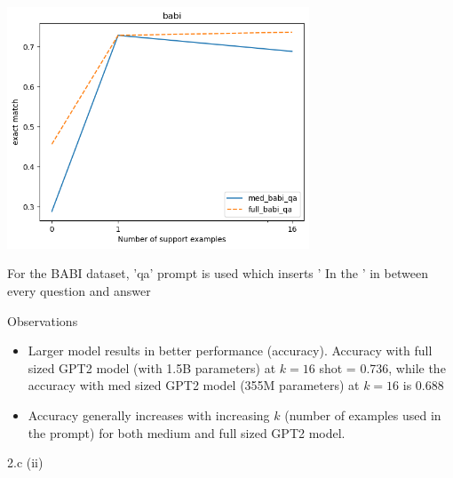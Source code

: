 \begin{answer}
    \includegraphics[width=9cm]{figures/icl_babi_plot.png}
    
    For the BABI dataset, 'qa' prompt is used which inserts ' In the ' in between every question and answer
    
    Observations
    \begin{itemize}
    \item Larger model results in better performance (accuracy). Accuracy with full sized GPT2 model (with 1.5B parameters) at $k=16$ shot = 0.736, while the accuracy with med sized GPT2 model (355M parameters) at $k=16$ is 0.688
    \item Accuracy generally increases with increasing $k$ (number of examples used in the prompt) for both medium and full sized GPT2 model. 
    \end{itemize}
    
\end{answer}

\clearpage

\LARGE
2.c (ii)
\normalsize

